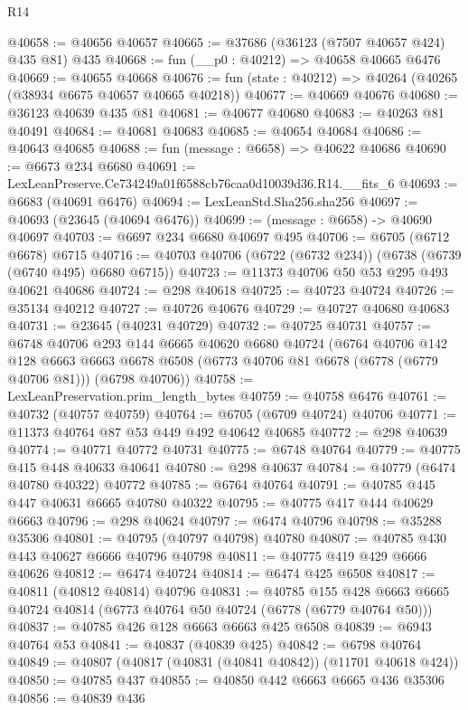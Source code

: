 \begin{lexlean}{R14}
\begin{coremodule}
@40658 := @40656 @40657
@40665 := @37686 (@36123 (@7507 @40657 @424) @435 @81) @435
@40668 := fun (__p0 : @40212) => @40658 @40665 @6476
@40669 := @40655 @40668
@40676 := fun (state : @40212) => @40264 (@40265 (@38934 @6675 @40657 @40665 @40218))
@40677 := @40669 @40676
@40680 := @36123 @40639 @435 @81
@40681 := @40677 @40680
@40683 := @40263 @81 @40491
@40684 := @40681 @40683
@40685 := @40654 @40684
@40686 := @40643 @40685
@40688 := fun (message : @6658) => @40622 @40686
@40690 := @6673 @234 @6680
@40691 := LexLeanPreserve.Ce734249a01f6588cb76caa0d10039d36.R14.__fits_6
@40693 := @6683 (@40691 @6476)
@40694 := LexLeanStd.Sha256.sha256
@40697 := @40693 (@23645 (@40694 @6476))
@40699 := (message : @6658) -> @40690 @40697
@40703 := @6697 @234 @6680 @40697 @495
@40706 := @6705 (@6712 @6678) @6715
@40716 := @40703 @40706 (@6722 (@6732 @234)) (@6738 (@6739 (@6740 @495) @6680 @6715))
@40723 := @11373 @40706 @50 @53 @295 @493 @40621 @40686
@40724 := @298 @40618
@40725 := @40723 @40724
@40726 := @35134 @40212
@40727 := @40726 @40676
@40729 := @40727 @40680 @40683
@40731 := @23645 (@40231 @40729)
@40732 := @40725 @40731
@40757 := @6748
    @40706
    @293
    @144
    @6665
    @40620
    @6680
    @40724
    (@6764
      @40706
      @142
      @128
      @6663
      @6663
      @6678
      @6508
      (@6773 @40706 @81 @6678 (@6778 (@6779 @40706 @81)))
      (@6798 @40706))
@40758 := LexLeanPreservation.prim_length_bytes
@40759 := @40758 @6476
@40761 := @40732 (@40757 @40759)
@40764 := @6705 (@6709 @40724) @40706
@40771 := @11373 @40764 @87 @53 @449 @492 @40642 @40685
@40772 := @298 @40639
@40774 := @40771 @40772 @40731
@40775 := @6748 @40764
@40779 := @40775 @415 @448 @40633 @40641
@40780 := @298 @40637
@40784 := @40779 (@6474 @40780 @40322) @40772
@40785 := @6764 @40764
@40791 := @40785 @445 @447 @40631 @6665 @40780 @40322
@40795 := @40775 @417 @444 @40629 @6663
@40796 := @298 @40624
@40797 := @6474 @40796
@40798 := @35288 @35306
@40801 := @40795 (@40797 @40798) @40780
@40807 := @40785 @430 @443 @40627 @6666 @40796 @40798
@40811 := @40775 @419 @429 @6666 @40626
@40812 := @6474 @40724
@40814 := @6474 @425 @6508
@40817 := @40811 (@40812 @40814) @40796
@40831 := @40785
    @155
    @428
    @6663
    @6665
    @40724
    @40814
    (@6773 @40764 @50 @40724 (@6778 (@6779 @40764 @50)))
@40837 := @40785 @426 @128 @6663 @6663 @425 @6508
@40839 := @6943 @40764 @53
@40841 := @40837 (@40839 @425)
@40842 := @6798 @40764
@40849 := @40807 (@40817 (@40831 (@40841 @40842)) (@11701 @40618 @424))
@40850 := @40785 @437
@40855 := @40850 @442 @6663 @6665 @436 @35306
@40856 := @40839 @436

\end{coremodule}
\end{lexlean}
